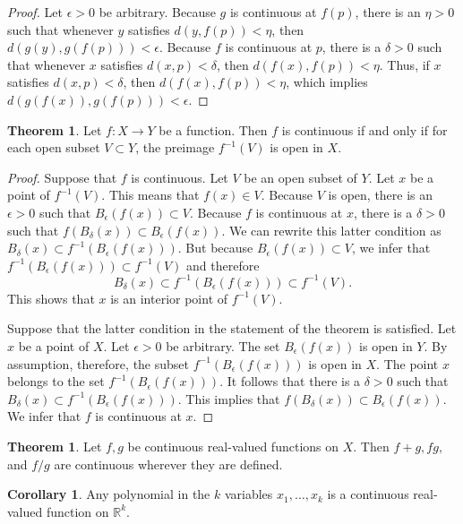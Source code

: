 \documentclass[12pt]{article}
\theoremstyle{definition}
\theoremstyle{theorem}
\newtheorem{theorem}[definition]{Theorem}
\newtheorem{corollary}[definition]{Corollary}
\begin{document}
\begin{proof}
Let $\epsilon > 0$ be arbitrary. Because $g$ is continuous at $f(p)$, there is an $\eta > 0$ such that whenever $y$ satisfies $d(y, f(p)) < \eta$, then $d(g(y), g(f(p))) < \epsilon$. Because $f$ is continuous at $p$, there is a $\delta > 0$ such that whenever $x$ satisfies $d(x,p) < \delta$, then $d(f(x), f(p)) < \eta$. Thus, if $x$ satisfies $d(x,p) < \delta$, then $d(f(x), f(p)) < \eta$, which implies $d(g(f(x)), g(f(p))) < \epsilon$. 
\end{proof}

\begin{theorem}\label{thm:continuous}
Let $f : X \to Y$ be a function. Then $f$ is continuous if and only if for each open subset $V \subset Y$, the preimage $f^{-1}(V)$ is open in $X$. 
\end{theorem}

\begin{proof}
Suppose that $f$ is continuous. Let $V$ be an open subset of $Y$. Let $x$ be a point of $f^{-1}(V)$. This means that $f(x) \in V$. Because $V$ is open, there is an $\epsilon > 0$ such that $B_\epsilon(f(x)) \subset V$. Because $f$ is continuous at $x$, there is a $\delta > 0$ such that $f(B_\delta(x)) \subset B_\epsilon(f(x))$. We can rewrite this latter condition as $B_\delta(x) \subset f^{-1}(B_\epsilon(f(x)))$. But because $B_\epsilon(f(x)) \subset V$, we infer that $f^{-1}(B_\epsilon(f(x))) \subset f^{-1}(V)$ and therefore 
\[
B_\delta(x) \subset f^{-1}(B_\epsilon(f(x))) \subset f^{-1}(V). 
\]
This shows that $x$ is an interior point of $f^{-1}(V)$. 

Suppose that the latter condition in the statement of the theorem is satisfied. Let $x$ be a point of $X$. Let $\epsilon > 0$ be arbitrary. The set $B_\epsilon(f(x))$ is open in $Y$. By assumption, therefore, the subset $f^{-1}(B_\epsilon(f(x)))$ is open in $X$. The point $x$ belongs to the set $f^{-1}(B_\epsilon(f(x)))$. It follows that there is a $\delta > 0$ such that $B_\delta(x) \subset f^{-1}(B_\epsilon(f(x)))$. This implies that $f(B_\delta(x)) \subset B_\epsilon(f(x))$. We infer that $f$ is continuous at $x$. 
\end{proof}

\begin{theorem}
Let $f,g$ be continuous real-valued functions on $X$. Then $f+g, fg,$ and $f/g$ are continuous wherever they are defined. 
\end{theorem}

\begin{corollary}
Any polynomial in the $k$ variables $x_1, \ldots, x_k$ is a continuous real-valued function on $\mathbb{R}^k$. 
\end{corollary}
\end{document}
